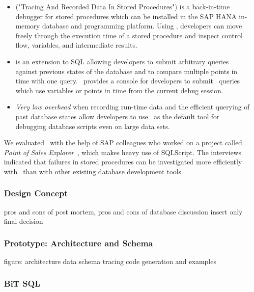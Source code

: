 \begin{itemize}
	\item \emph{\tool} ("Tracing And Recorded Data In Stored Procedures") is a back-in-time debugger for stored procedures which can be installed in the SAP HANA in-memory database and programming platform.
		Using \tool, developers can move freely through the execution time of a stored procedure and inspect control flow, variables, and intermediate results.
	
	\item \emph{\SQLextension} is an extension to SQL allowing developers to submit arbitrary queries against previous states of the database 
		and to compare multiple points in time with one query.
		\tool\ provides a console for developers to submit \SQLextension\ queries which use variables or points in time from the current debug session.

	\item \emph{Very low overhead} when recording run-time data and the efficient querying of past database states allow developers to use \tool\ as the default tool for debugging database scripts even on large data sets.
	
\end{itemize}

We evaluated \tool\ with the help of SAP colleagues who worked on a project called \emph{Point of Sales Explorer}~\cite{plattner15:the_in-memory_revolution_how}, which makes heavy use of SQLScript. 
The interviews indicated that failures in stored procedures can be investigated more efficiently with \tool\ than with other existing database development tools.

\tmpEnd

\tmpStart

\subsubsection{Design Concept}
pros and cons of post mortem,
pros and cons of database
discussion insert only
final decision

\subsubsection{Prototype: Architecture and Schema}
figure: architecture
data schema
tracing code generation and examples

\subsubsection{BiT SQL}

